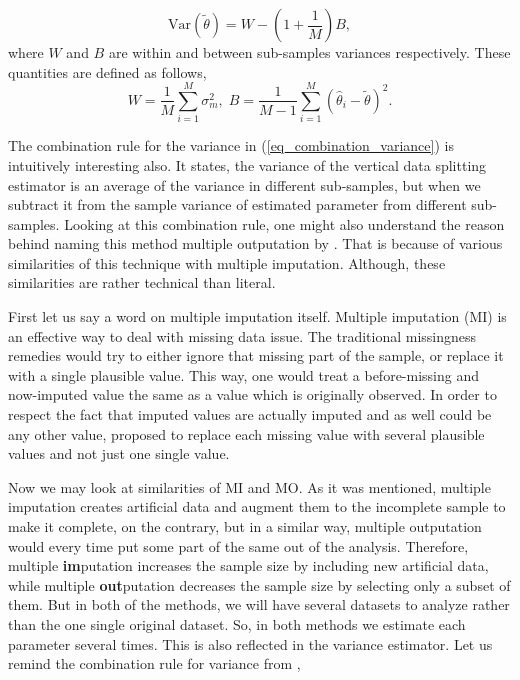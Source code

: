 \documentclass[11pt,a5paper,twoside]{book}
\begin{document}
\begin{equation}
\label{eq_combination_variance}
\mathrm{Var}(\widetilde{\theta}) = W - \left(1 + \frac{1}{M}\right) B,
\end{equation}
where $W$ and $B$ are within and between sub-samples variances respectively. These quantities are defined as follows,
\begin{equation}
\label{eq_W_B_Var}
W = \frac{1}{M} \sum_{i=1}^M \sigma^2_m,\; B = \frac{1}{M-1} \sum_{i=1}^M \left(\widehat{\theta}_i - \widetilde{\theta} \right)^2.
\end{equation}

The combination rule for the variance in (\ref{eq_combination_variance}) is intuitively interesting also. It states, the variance of the vertical data splitting estimator is an average of the variance in different sub-samples, but when we subtract it from the sample variance of estimated parameter from different sub-samples. Looking at this combination rule, one might also understand the reason behind naming this method multiple outputation by \cite{follmann2003}. That is because of various similarities of this technique with multiple imputation. Although, these similarities are rather technical than literal. 

First let us say a word on multiple imputation itself. Multiple imputation (MI) is an effective way to deal with missing data issue. The traditional missingness remedies would try to either ignore that missing part of the sample, or replace it with a single plausible value. This way, one would treat a before-missing and now-imputed value the same as a value which is originally observed. In order to respect the fact that imputed values are actually imputed and as well could be any other value, \cite{rubin1978} proposed to replace each missing value with several plausible values and not just one single value. 


Now we may look at similarities of MI and MO. As it was mentioned, multiple imputation creates artificial data and augment them to the incomplete sample to make it complete, on the contrary, but in a similar way, multiple outputation would every time put some part of the same out of the analysis. Therefore, multiple \textbf{im}putation increases the sample size by including new artificial data, while multiple \textbf{out}putation decreases the sample size by selecting only a subset of them. But in both of the methods, we will have several datasets to analyze rather than the one single original dataset. So, in both methods we estimate each parameter several times. This is also reflected in the variance estimator. Let us remind the combination rule for variance from \cite{rubin1987},
\end{document}
